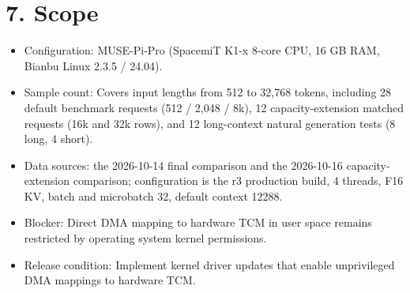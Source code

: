 \documentclass[10pt,a4paper]{article}
\begin{document}
\section{7. Scope}

\begin{itemize}
  \item Configuration: MUSE-Pi-Pro (SpacemiT K1-x 8-core CPU, 16 GB RAM, Bianbu Linux 2.3.5 / 24.04).
  \item Sample count: Covers input lengths from 512 to 32,768 tokens, including 28 default benchmark requests (512 / 2,048 / 8k), 12 capacity-extension matched requests (16k and 32k rows), and 12 long-context natural generation tests (8 long, 4 short).
  \item Data sources: the 2026-10-14 final comparison and the 2026-10-16 capacity-extension comparison; configuration is the r3 production build, 4 threads, F16 KV, batch and microbatch 32, default context 12288.
  \item Blocker: Direct DMA mapping to hardware TCM in user space remains restricted by operating system kernel permissions.
  \item Release condition: Implement kernel driver updates that enable unprivileged DMA mappings to hardware TCM.
\end{itemize}
\end{document}
